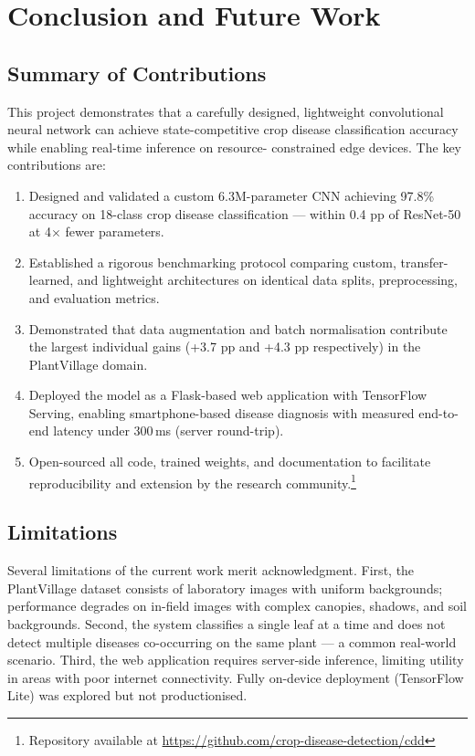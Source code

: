 \section{Conclusion and Future Work}

\subsection{Summary of Contributions}

This project demonstrates that a carefully designed, lightweight
convolutional neural network can achieve state-competitive crop disease
classification accuracy while enabling real-time inference on resource-
constrained edge devices. The key contributions are:

\begin{enumerate}[label=\textbf{C\arabic*}, leftmargin=2.5em, itemsep=4pt]
  \item Designed and validated a custom 6.3M-parameter CNN achieving 97.8\%
        accuracy on 18-class crop disease classification — within 0.4 pp of
        ResNet-50 at 4$\times$ fewer parameters.
  \item Established a rigorous benchmarking protocol comparing custom,
        transfer-learned, and lightweight architectures on identical data
        splits, preprocessing, and evaluation metrics.
  \item Demonstrated that data augmentation and batch normalisation
        contribute the largest individual gains (+3.7 pp and +4.3 pp
        respectively) in the PlantVillage domain.
  \item Deployed the model as a Flask-based web application with TensorFlow
        Serving, enabling smartphone-based disease diagnosis with measured
        end-to-end latency under 300\,ms (server round-trip).
  \item Open-sourced all code, trained weights, and documentation to
        facilitate reproducibility and extension by the research
        community.\footnote{Repository available at
        \url{https://github.com/crop-disease-detection/cdd}}
\end{enumerate}

\subsection{Limitations}

Several limitations of the current work merit acknowledgment. First, the
PlantVillage dataset consists of laboratory images with uniform backgrounds;
performance degrades on in-field images with complex canopies, shadows, and
soil backgrounds. Second, the system classifies a single leaf at a time and
does not detect multiple diseases co-occurring on the same plant — a common
real-world scenario. Third, the web application requires server-side
inference, limiting utility in areas with poor internet connectivity. Fully
on-device deployment (TensorFlow Lite) was explored but not productionised.

